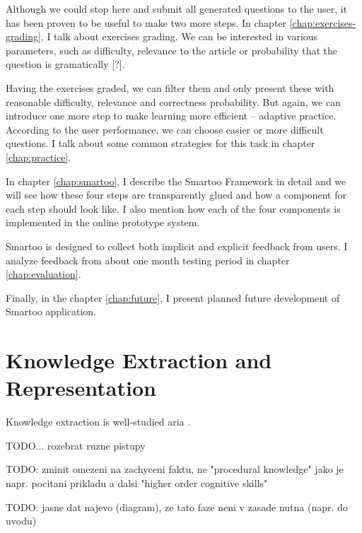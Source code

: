 \documentclass[a4paper, 12pt, twoside]{fithesis2}		%
\renewcommand{\_}{\leavevmode \kern0.0em\vbox{\hrule width0.4em}}
\begin{document}
Although we could stop here and submit all generated questions to the user, it has been proven to be useful to make two more steps.
In chapter \ref{chap:exercises-grading}, I talk about exercises grading.
We can be interested in various parameters, such as difficulty, relevance to the article or probability that the question is gramatically [?].

Having the exercises graded, we can filter them and only present these with reasonable difficulty, relevance and correctness probability.
But again, we can introduce one more step to make learning more efficient -- adaptive practice.
According to the user performance, we can choose easier or more difficult questions. I talk about some common strategies for this task in chapter \ref{chap:practice}.

In chapter \ref{chap:smartoo}, I describe the Smartoo Framework in detail
and we will see how these four steps are transparently glued and how a component for each step should look like.
I also mention how each of the four components is implemented in the online prototype system.

Smartoo is designed to collect both implicit and explicit feedback from users.
I analyze feedback from about one month testing period in chapter \ref{chap:evaluation}.

Finally, in the chapter \ref{chap:future}, I present planned future development of Smartoo application.




\chapter{Knowledge Extraction and Representation}
\label{chap:knowledge}

Knowledge extraction is well-studied aria \parencite{triples-acquisition}.

TODO... rozebrat ruzne pistupy


TODO: zminit omezeni na zachyceni faktu, ne "procedural knowledge" jako je napr. pocitani prikladu a dalsi "higher order cognitive skills"



TODO: jasne dat najevo (diagram), ze tato faze neni v zasade nutna (napr. do uvodu)
\end{document}
